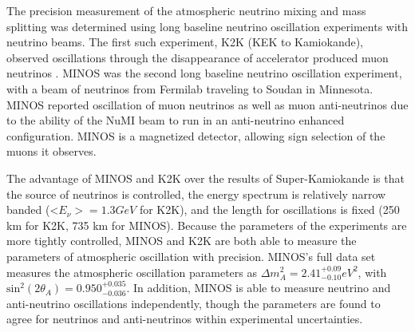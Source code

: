 The precision measurement of the atmospheric neutrino mixing and mass splitting was determined using long baseline neutrino oscillation experiments with neutrino beams.  The first such experiment, K2K (KEK to Kamiokande), observed oscillations through the disappearance of accelerator produced muon neutrinos \cite{PhysRevD.74.072003}.  MINOS was the second long baseline neutrino oscillation experiment, with a beam of neutrinos from Fermilab traveling to Soudan in Minnesota.  MINOS reported oscillation \cite{PhysRevLett.106.181801} of muon neutrinos as well as muon anti-neutrinos due to the ability of the NuMI beam to run in an anti-neutrino enhanced configuration.  MINOS is a magnetized detector, allowing sign selection of the muons it observes.

The advantage of MINOS and K2K over the results of Super-Kamiokande is that the source of neutrinos is controlled, the energy spectrum is relatively narrow banded (<$E_\nu> = 1.3 GeV$ for K2K), and the length for oscillations is fixed (250 km for K2K, 735 km for MINOS).  Because the parameters of the experiments are more tightly controlled, MINOS and K2K are both able to measure the parameters of atmospheric oscillation with precision.  MINOS's full data set \cite{PhysRevD.86.052007} measures the atmospheric oscillation parameters as $\Delta m^2_A = 2.41^{+0.09}_{-0.10} eV^2$, with $\text{sin}^2(2\theta_A) = 0.950^{+0.035}_{-0.036}$.  In addition, MINOS is able to measure neutrino and anti-neutrino oscillations independently, though the parameters are found to agree for neutrinos and anti-neutrinos within experimental uncertainties.

